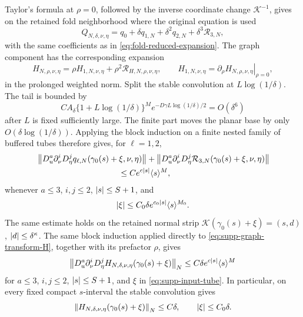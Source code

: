 Taylor's formula at \(\rho=0\), followed by the inverse coordinate change
\(\mathcal K^{-1}\), gives on the retained fold neighborhood where the
original equation is used
\begin{equation}
 Q_{N,\delta,\nu,\eta}
 =q_0+\delta q_{1,N}+\delta^2q_{2,N}
      +\delta^3\mathcal R_{3,N},
 \label{eq:supp-reduced-expansion}
\end{equation}
with the same coefficients as in \cref{eq:fold-reduced-expansion}.  The graph
component has the corresponding expansion
\begin{equation}
 H_{N,\rho,\nu,\eta}
 =\rho H_{1,N,\nu,\eta}+\rho^2\mathcal R_{H,N,\rho,\nu,\eta},
 \qquad
 H_{1,N,\nu,\eta}
 =\left.\partial_\rho H_{N,\rho,\nu,\eta}\right|_{\rho=0},
 \label{eq:supp-first-graph-coefficient}
\end{equation}
in the prolonged weighted norm.  Split
the stable convolution at \(L\log(1/\delta)\).  The tail is bounded by
\begin{equation}
 CA_\delta\{1+L\log(1/\delta)\}^M
 e^{-D\gamma L\log(1/\delta)/2}=O(\delta^6)
 \label{eq:supp-convolution-tail}
\end{equation}
after \(L\) is fixed sufficiently large.  The finite part moves the planar
base by only \(O(\delta\log(1/\delta))\).  Applying the block induction on
a finite nested family of buffered tubes therefore gives, for
\(\ell=1,2\),
\begin{equation}
 \begin{split}
 &\norm{D_u^a\partial_\nu^iD_\eta^j
     q_{\ell,N}(\gamma_0(s)+\xi,\nu,\eta)}
 +\norm{D_u^a\partial_\nu^iD_\eta^j
     \mathcal R_{3,N}(\gamma_0(s)+\xi,\nu,\eta)}\\
 &\hspace{35mm}\le Ce^{c\abs s}\langle s\rangle^M,
 \end{split}
 \label{eq:supp-coefficient-envelope}
\end{equation}
whenever \(a\le3\), \(i,j\le2\), \(\left\lvert s\right\rvert\le S+1\),
and
\begin{equation}
 \left\lvert\xi\right\rvert\le C_0\delta e^{c_0\left\lvert s\right\rvert}\langle s\rangle^{M_0}.
 \label{eq:supp-input-tube}
\end{equation}
The same estimate holds on the retained normal strip
\(\mathcal K(\gamma_0(s)+\xi)=(s,d)\), \(\left\lvert d\right\rvert\le\delta^\kappa\).
The same block induction applied directly to
\cref{eq:supp-graph-transform-H}, together with its prefactor \(\rho\), gives
\begin{equation}
 \left\lVert D_u^a\partial_\nu^iD_\eta^j
 H_{N,\delta,\nu,\eta}(\gamma_0(s)+\xi)\right\rVert_N
 \le C\delta e^{c\left\lvert s\right\rvert}\langle s\rangle^M
 \label{eq:supp-expanding-window-graph-bound}
\end{equation}
for \(a\le3\), \(i,j\le2\), \(\left\lvert s\right\rvert\le S+1\), and \(\xi\) in
\cref{eq:supp-input-tube}.  In particular, on every fixed compact
\(s\)-interval the stable convolution gives
\begin{equation}
 \left\lVert H_{N,\delta,\nu,\eta}(\gamma_0(s)+\xi)\right\rVert_N
 \le C\delta,\qquad \left\lvert\xi\right\rvert\le C_0\delta.
 \label{eq:supp-local-graph-size}
\end{equation}

